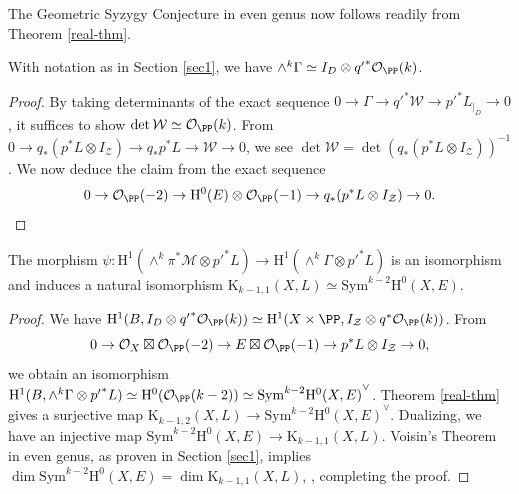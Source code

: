 The Geometric Syzygy Conjecture in even genus now follows readily from Theorem \ref{real-thm}.
\begin{lem}
\notready
With notation as in Section \ref{sec1}, we have $\wedge^k \Gamma \simeq I_D \otimes {q'}^* \mathcal{O}_{\PP}(k)$.
\end{lem}
\begin{proof}
By taking determinants of the exact sequence $0 \to \Gamma \to {q'}^* \mathcal{W} \to {p'}^* L_{|_D} \to 0$, it suffices to show $\det \mathcal{W} \simeq \mathcal{O}_{\PP}(k)$. From $0 \to q_*(p^*L \otimes I_{\mathcal{Z}}) \to q_*p^*L \to \mathcal{W} \to 0$, we see $\det \mathcal{W}=\det (q_*(p^*L \otimes I_{\mathcal{Z}}))^{-1}$. We now deduce the claim from the exact sequence
$$0 \to \mathcal{O}_{\PP}(-2) \to \mathrm{H}^0(E) \otimes \mathcal{O}_{\PP}(-1) \to q_*(p^*L \otimes I_{\mathcal{Z}}) \to 0.$$\end{proof}
\begin{cor}
\notready \label{main-cor-nat-iso}
The morphism $\psi: \mathrm{H}^1(\wedge^k \pi^* \mathcal{M} \otimes {p'}^*L) \to \mathrm{H}^1(\wedge^k \Gamma \otimes {p'}^*L)$ is an isomorphism and induces a natural isomorphism $\mathrm{K}_{k-1,1}(X,L) \simeq \mathrm{Sym}^{k-2}\mathrm{H}^0(X,E)  $.
\end{cor}
\begin{proof}
We have $\mathrm{H}^1(B, I_D \otimes {q'}^* \mathcal{O}_{\PP}(k))\simeq \mathrm{H}^1(X \times \PP, I_{\mathcal{Z}} \otimes {q}^* \mathcal{O}_{\PP}(k))$. From
$$0 \to \mathcal{O}_X \boxtimes \mathcal{O}_{\PP}(-2) \to E \boxtimes \mathcal{O}_{\PP}(-1) \to p^*L \otimes  I_{\mathcal{Z}} \to 0,$$
we obtain an isomorphism $\mathrm{H}^1(B, \wedge^k \Gamma \otimes {p'}^*L) \simeq \mathrm{H}^0(\mathcal{O}_{\PP}(k-2)) \simeq {\mathrm{Sym}^{k-2}\mathrm{H}^0(X,E)}^{\vee}$. Theorem \ref{real-thm} gives a surjective map $\mathrm{K}_{k-1,2}(X,L) \to {\mathrm{Sym}^{k-2}\mathrm{H}^0(X,E)}^{\vee}$. Dualizing, we have an injective map $\mathrm{Sym}^{k-2}\mathrm{H}^0(X,E) \to \mathrm{K}_{k-1,1}(X,L).$ Voisin's Theorem in even genus, as proven in Section \ref{sec1}, implies $\dim \mathrm{Sym}^{k-2}\mathrm{H}^0(X,E) = \dim \mathrm{K}_{k-1,1}(X,L)$,  \cite[\S 4.1]{farkas-progress}, completing the proof.\end{proof}

